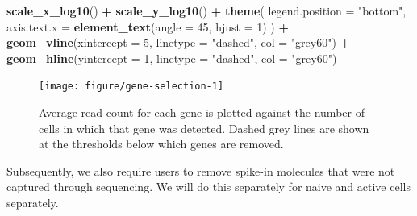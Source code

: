 \documentclass[9pt,a4paper,]{extarticle}
\newenvironment{Shaded}{\begin{snugshade}}{\end{snugshade}}
\newcommand{\CommentTok}[1]{\textcolor[rgb]{0.56,0.35,0.01}{\textit{#1}}}
\newcommand{\DataTypeTok}[1]{\textcolor[rgb]{0.13,0.29,0.53}{#1}}
\newcommand{\DecValTok}[1]{\textcolor[rgb]{0.00,0.00,0.81}{#1}}
\newcommand{\KeywordTok}[1]{\textcolor[rgb]{0.13,0.29,0.53}{\textbf{#1}}}
\newcommand{\NormalTok}[1]{#1}
\newcommand{\OperatorTok}[1]{\textcolor[rgb]{0.81,0.36,0.00}{\textbf{#1}}}
\newcommand{\StringTok}[1]{\textcolor[rgb]{0.31,0.60,0.02}{#1}}
\begin{document}
\begin{Shaded}
\begin{Highlighting}[]
\StringTok{  }\KeywordTok{scale_x_log10}\NormalTok{() }\OperatorTok{+}
\StringTok{  }\KeywordTok{scale_y_log10}\NormalTok{() }\OperatorTok{+}
\StringTok{  }\KeywordTok{theme}\NormalTok{(}
    \DataTypeTok{legend.position =} \StringTok{"bottom"}\NormalTok{,}
    \DataTypeTok{axis.text.x =} \KeywordTok{element_text}\NormalTok{(}\DataTypeTok{angle =} \DecValTok{45}\NormalTok{, }\DataTypeTok{hjust =} \DecValTok{1}\NormalTok{)}
\NormalTok{  ) }\OperatorTok{+}
\KeywordTok{geom_vline}\NormalTok{(}\DataTypeTok{xintercept =} \DecValTok{5}\NormalTok{, }\DataTypeTok{linetype =} \StringTok{"dashed"}\NormalTok{, }\DataTypeTok{col =} \StringTok{"grey60"}\NormalTok{) }\OperatorTok{+}
\KeywordTok{geom_hline}\NormalTok{(}\DataTypeTok{yintercept =} \DecValTok{1}\NormalTok{, }\DataTypeTok{linetype =} \StringTok{"dashed"}\NormalTok{, }\DataTypeTok{col =} \StringTok{"grey60"}\NormalTok{)}
\end{Highlighting}
\end{Shaded}

\begin{figure}

{\centering \texttt{[image: figure/gene-selection-1]} 

}

\caption{Average read-count for each gene is plotted against the number of cells in which that gene was detected. Dashed grey lines are shown at the thresholds below which genes are removed.}\label{fig:gene-selection}
\end{figure}

\begin{Shaded}
\end{Shaded}

Subsequently, we also require users to remove spike-in molecules that were not
captured through sequencing. We will do this separately for naive and active
cells separately.
\end{document}

